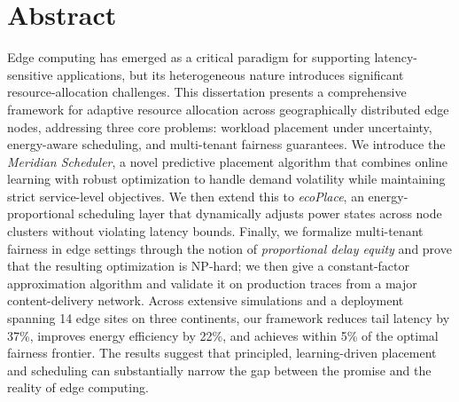 \documentclass[12pt,oneside]{book}
\begin{document}
\chapter*{Abstract}
\thispagestyle{plain}

Edge computing has emerged as a critical paradigm for supporting
latency-sensitive applications, but its heterogeneous nature introduces
significant resource-allocation challenges. This dissertation presents a
comprehensive framework for adaptive resource allocation across geographically
distributed edge nodes, addressing three core problems: workload placement
under uncertainty, energy-aware scheduling, and multi-tenant fairness
guarantees. We introduce the \emph{Meridian Scheduler}, a novel predictive
placement algorithm that combines online learning with robust optimization to
handle demand volatility while maintaining strict service-level objectives. We
then extend this to \emph{ecoPlace}, an energy-proportional scheduling layer
that dynamically adjusts power states across node clusters without violating
latency bounds. Finally, we formalize multi-tenant fairness in edge settings
through the notion of \emph{proportional delay equity} and prove that the
resulting optimization is NP-hard; we then give a constant-factor approximation
algorithm and validate it on production traces from a major content-delivery
network. Across extensive simulations and a deployment spanning 14 edge sites on
three continents, our framework reduces tail latency by 37\%, improves energy
efficiency by 22\%, and achieves within 5\% of the optimal fairness frontier.
The results suggest that principled, learning-driven placement and scheduling can
substantially narrow the gap between the promise and the reality of edge computing.

\cleardoublepage
{}
{}
\renewcommand{\contentsname}{Table of Contents}
\tableofcontents
\thispagestyle{plain}

\cleardoublepage
{}
{}
\listoffigures
\thispagestyle{plain}

\cleardoublepage
{}
{}
\listoftables
\thispagestyle{plain}
\end{document}
